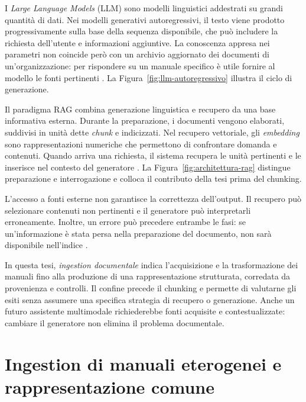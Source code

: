 I \emph{Large Language Models} (LLM) sono modelli linguistici addestrati su grandi quantità di dati. Nei modelli generativi autoregressivi, il testo viene prodotto progressivamente sulla base della sequenza disponibile, che può includere la richiesta dell'utente e informazioni aggiuntive. La conoscenza appresa nei parametri non coincide però con un archivio aggiornato dei documenti di un'organizzazione: per rispondere su un manuale specifico è utile fornire al modello le fonti pertinenti \parencite{lewis2020rag}. La Figura~\ref{fig:llm-autoregressivo} illustra il ciclo di generazione.



Il paradigma RAG combina generazione linguistica e recupero da una base informativa esterna. Durante la preparazione, i documenti vengono elaborati, suddivisi in unità dette \emph{chunk} e indicizzati. Nel recupero vettoriale, gli \emph{embedding} sono rappresentazioni numeriche che permettono di confrontare domanda e contenuti. Quando arriva una richiesta, il sistema recupera le unità pertinenti e le inserisce nel contesto del generatore \parencite{lewis2020rag,amugongo2025review}. La Figura~\ref{fig:architettura-rag} distingue preparazione e interrogazione e colloca il contributo della tesi prima del chunking.



L'accesso a fonti esterne non garantisce la correttezza dell'output. Il recupero può selezionare contenuti non pertinenti e il generatore può interpretarli erroneamente. Inoltre, un errore può precedere entrambe le fasi: se un'informazione è stata persa nella preparazione del documento, non sarà disponibile nell'indice \parencite{amugongo2025review}.

In questa tesi, \emph{ingestion documentale} indica l'acquisizione e la trasformazione dei manuali fino alla produzione di una rappresentazione strutturata, corredata da provenienza e controlli. Il confine precede il chunking e permette di valutarne gli esiti senza assumere una specifica strategia di recupero o generazione. Anche un futuro assistente multimodale richiederebbe fonti acquisite e contestualizzate: cambiare il generatore non elimina il problema documentale.

\section{Ingestion di manuali eterogenei e rappresentazione comune}
\label{sec:rappresentazione-manuali}

